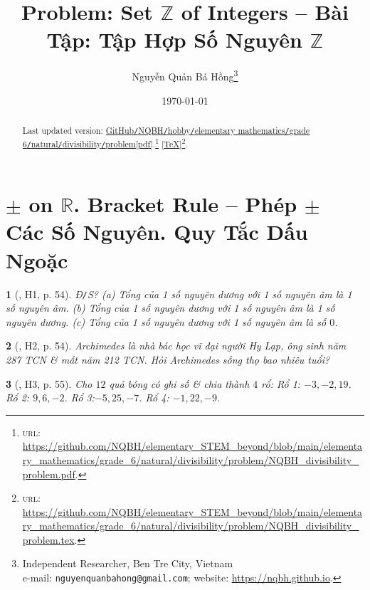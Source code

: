 \documentclass{article}
\title{Problem: Set $\mathbb{Z}$ of Integers -- Bài Tập: Tập Hợp Số Nguyên $\mathbb{Z}$}
\author{Nguyễn Quản Bá Hồng\footnote{Independent Researcher, Ben Tre City, Vietnam\\e-mail: \texttt{nguyenquanbahong@gmail.com}; website: \url{https://nqbh.github.io}.}}
\date{\today}
\newtheorem{baitoan}{}
\begin{document}
\maketitle
\begin{abstract}
	Last updated version: \href{https://github.com/NQBH/elementary_STEM_beyond/blob/main/elementary_mathematics/grade_6/natural/divisibility/problem/NQBH_divisibility_problem.pdf}{GitHub{\tt/}NQBH{\tt/}hobby{\tt/}elementary mathematics{\tt/}grade 6{\tt/}natural{\tt/}divisibility{\tt/}problem[pdf]}.\footnote{\textsc{url}: \url{https://github.com/NQBH/elementary_STEM_beyond/blob/main/elementary_mathematics/grade_6/natural/divisibility/problem/NQBH_divisibility_problem.pdf}.} [\href{https://github.com/NQBH/elementary_STEM_beyond/blob/main/elementary_mathematics/grade_6/natural/divisibility/problem/NQBH_divisibility_problem.tex}{\TeX}]\footnote{\textsc{url}: \url{https://github.com/NQBH/elementary_STEM_beyond/blob/main/elementary_mathematics/grade_6/natural/divisibility/problem/NQBH_divisibility_problem.tex}.}. 
\end{abstract}
\tableofcontents


\section{$\pm$ on $\mathbb{R}$. Bracket Rule -- Phép $\pm$ Các Số Nguyên. Quy Tắc Dấu Ngoặc}

\begin{baitoan}[\cite{Binh_boi_duong_Toan_6_tap_1}, H1, p. 54]
	{\rm Đ{\tt/}S?} (a) Tổng của 1 số nguyên dương với 1 số nguyên âm là 1 số nguyên âm. (b) Tổng của 1 số nguyên dương với 1 số nguyên âm là 1 số nguyên dương. (c) Tổng của 1 số nguyên dương với 1 số nguyên âm là số $0$.
\end{baitoan}

\begin{baitoan}[\cite{Binh_boi_duong_Toan_6_tap_1}, H2, p. 54]
	Archimedes là nhà bác học vĩ đại người Hy Lạp, ông sinh năm {\rm287 TCN} \& mất năm {\rm212 TCN}. Hỏi Archimedes sống thọ bao nhiêu tuổi?
\end{baitoan}

\begin{baitoan}[\cite{Binh_boi_duong_Toan_6_tap_1}, H3, p. 55]
	Cho $12$ quả bóng có ghi số \& chia thành $4$ rổ: Rổ 1: $-3,-2,19$. Rổ 2: $9,6,-2$. Rổ 3:$-5,25,-7$. Rổ 4: $-1,22,-9$.
\end{baitoan}
\end{document}
